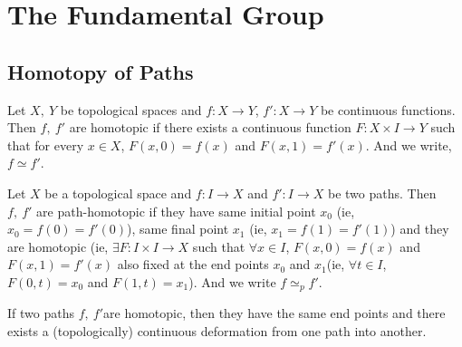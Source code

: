 
\chapter{The Fundamental Group}
\section{Homotopy of Paths}
\begin{definition}
	Let $X,\ Y$ be topological spaces and $f : X \to Y$, $f':X \to Y$ be continuous functions. Then $f,\ f'$ are homotopic if there exists a continuous function $F : X \times I \to Y$ such that for every $x \in X$, $F(x,0) = f(x)$ and $F(x,1) = f'(x)$. And we write, $f \simeq f'$.
\end{definition}

\begin{definition}
	Let $X$ be a topological space and $f : I \to X$ and $f' : I \to X$ be two paths. Then $f,\ f'$ are path-homotopic if they have same initial point $x_0$ (ie, $x_0=f(0)=f'(0)$), same final point $x_1$ (ie, $x_1=f(1)=f'(1)$) and they are homotopic (ie, $\exists F: I \times I \to X$ such that $\forall x \in I$, $F(x,0)=f(x)$ and $F(x,1)=f'(x)$ also fixed at the end points $x_0$ and $x_1$(ie, $\forall t \in I$, $F(0,t) = x_0$ and $F(1,t) = x_1$). And we write $f \simeq_p f'$.
\end{definition}

\begin{remark}
	If two paths $f,\ f'$are homotopic, then they have the same end points and there exists a (topologically) continuous deformation from one path into another.
\end{remark}

